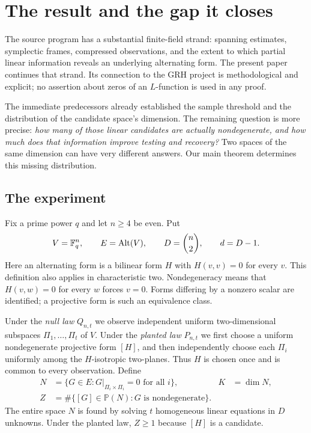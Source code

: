 \section{The result and the gap it closes}
\label{sec:main}

The source program has a substantial finite-field strand: spanning estimates,
symplectic frames, compressed observations, and the extent to which partial
linear information reveals an underlying alternating form. The present paper
continues that strand. Its connection to the GRH project is methodological and
explicit; no assertion about zeros of an $L$-function is used in any proof.

The immediate predecessors \cite{hidden,critical} already established the
sample threshold and the distribution of the candidate space's dimension.
The remaining question is more precise: \emph{how many of those linear
candidates are actually nondegenerate, and how much does that information
improve testing and recovery?} Two spaces of the same dimension can have very
different answers. Our main theorem determines this missing distribution.

\subsection{The experiment}

Fix a prime power $q$ and let $n\ge4$ be even. Put
\[
 V=\mathbb F_q^n,\qquad E=\operatorname{Alt}(V),\qquad
 D=\binom n2,\qquad d=D-1.
\]
Here an alternating form is a bilinear form $H$ with $H(v,v)=0$ for every
$v$. This definition also applies in characteristic two. Nondegeneracy means
that $H(v,w)=0$ for every $w$ forces $v=0$. Forms differing by a nonzero scalar
are identified; a projective form is such an equivalence class.

Under the \emph{null law} $Q_{n,t}$ we observe independent uniform
two-dimensional subspaces $\Pi_1,\ldots,\Pi_t$ of $V$.
Under the \emph{planted law} $P_{n,t}$ we first choose a uniform nondegenerate
projective form $[H]$, and then independently choose each $\Pi_i$ uniformly
among the $H$-isotropic two-planes. Thus $H$ is chosen once and is common to
every observation. Define
\begin{align}
 N&=\{G\in E:G|_{\Pi_i\times\Pi_i}=0\text{ for all }i\},
 &K&=\dim N,\label{eq:candidates}\\
 Z&=\#\{[G]\in\mathbb P(N):G\text{ is nondegenerate}\}.
 \label{eq:Z}
\end{align}
The entire space $N$ is found by solving $t$ homogeneous linear equations in
$D$ unknowns. Under the planted law, $Z\ge1$ because $[H]$ is a candidate.


